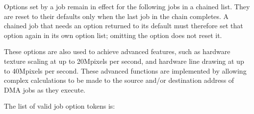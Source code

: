 Options set by a job remain in effect for the following jobs in a
chained list. They are reset to their defaults only when the last job
in the chain completes. A chained job that needs an option returned to
its default must therefore set that option again in its own option
list; omitting the option does not reset it.

These options are also used to achieve advanced features, such as hardware
texture scaling at up to 20Mpixels per second, and hardware line drawing
at up to 40Mpixels per second. These advanced functions are implemented
by allowing complex calculations to be made to the source and/or destination
address of DMA jobs as they execute.

The list of valid job option tokens is:

